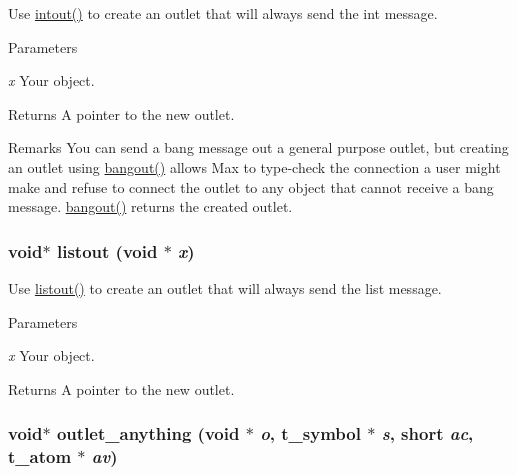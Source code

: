 Use \hyperlink{group__inout_ga9b8d897c728eeafa5638d4fc16ff704e}{intout()} to create an outlet that will always send the int message. 
\begin{DoxyParams}{Parameters}
\item[{\em x}]Your object. \end{DoxyParams}
\begin{DoxyReturn}{Returns}
A pointer to the new outlet.
\end{DoxyReturn}
\begin{DoxyRemark}{Remarks}
You can send a bang message out a general purpose outlet, but creating an outlet using \hyperlink{group__inout_ga69d26d4f2684aab7dbc1b2d18248eae5}{bangout()} allows Max to type-\/check the connection a user might make and refuse to connect the outlet to any object that cannot receive a bang message. \hyperlink{group__inout_ga69d26d4f2684aab7dbc1b2d18248eae5}{bangout()} returns the created outlet. 
\end{DoxyRemark}
\hypertarget{group__inout_ga47841be73d0c90978da818f0f7c899eb}{
\subsubsection[{listout}]{\setlength{\rightskip}{0pt plus 5cm}void$\ast$ listout (void $\ast$ {\em x})}}
\label{group__inout_ga47841be73d0c90978da818f0f7c899eb}


Use \hyperlink{group__inout_ga47841be73d0c90978da818f0f7c899eb}{listout()} to create an outlet that will always send the list message. 
\begin{DoxyParams}{Parameters}
\item[{\em x}]Your object. \end{DoxyParams}
\begin{DoxyReturn}{Returns}
A pointer to the new outlet. 
\end{DoxyReturn}
\hypertarget{group__inout_ga12798ee897e01dac21ee547c4091d8a8}{
\subsubsection[{outlet\_\-anything}]{\setlength{\rightskip}{0pt plus 5cm}void$\ast$ outlet\_\-anything (void $\ast$ {\em o}, \/  {\bf t\_\-symbol} $\ast$ {\em s}, \/  short {\em ac}, \/  {\bf t\_\-atom} $\ast$ {\em av})}}
\label{group__inout_ga12798ee897e01dac21ee547c4091d8a8}


